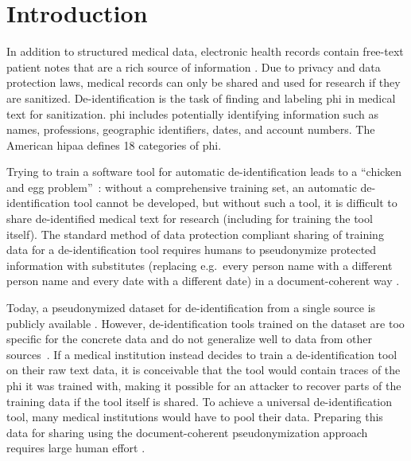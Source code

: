 
\section{Introduction}\label{sec:introduction}
%
In addition to structured medical data, electronic health records contain free-text patient notes that are a rich source of information \citep{jensen2012mining}.
%
Due to privacy and data protection laws, medical records can only be shared and used for research if they are sanitized.
%
De-identification is the task of finding and labeling \ac{phi} in medical text for sanitization.
%
\Ac{phi} includes potentially identifying information such as names, professions, geographic identifiers, dates, and account numbers.
%
The American \ac{hipaa} defines 18 categories of \ac{phi}.



%
Trying to train a software tool for automatic de-identification leads to a ``chicken and egg problem''~\citep{uzuner2007evaluating}: without a comprehensive training set, an automatic de-identification tool cannot be developed, but without such a tool, it is difficult to share de-identified medical text for research (including for training the tool itself).
%
The standard method of data protection compliant sharing of training data for a de-identification tool requires humans to pseudonymize protected information with substitutes (replacing e.g.\ every person name with a different person name and every date with a different date) in a document-coherent way \cite{uzuner2007evaluating}.


%
Today, a pseudonymized dataset for de-identification from a single source is publicly available \citep{stubbs2015annotating}.
%
However, de-identification tools trained on the dataset are too specific for the concrete data and do not generalize well to data from other sources~\citep{stubbs2017identification}.
%
If a medical institution instead decides to train a de-identification tool on their raw text data, it is conceivable that the tool would contain traces of the \ac{phi} it was trained with, making it possible for an attacker to recover parts of the training data if the tool itself is shared.
%
To achieve a universal de-identification tool, many medical institutions would have to pool their data.
%
Preparing this data for sharing using the document-coherent pseudonymization approach requires large human effort \citep{dernoncourt2017identification}.

